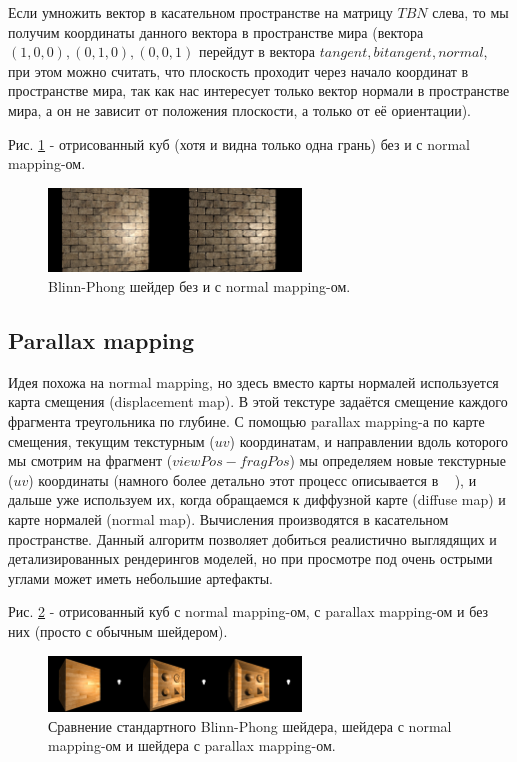 \documentclass[14pt]{extarticle}
\begin{document}
Если умножить вектор в касательном пространстве на матрицу $TBN$ слева, то мы получим координаты данного вектора в пространстве мира (вектора $(1,0,0), (0,1,0), (0,0,1)$ перейдут в вектора $tangent, bitangent, normal$, при этом можно считать, что плоскость проходит через начало координат в пространстве мира, так как нас интересует только вектор нормали в пространстве мира, а он не зависит от положения плоскости, а только от её ориентации).

Рис. \ref{fig:normal} - отрисованный куб (хотя и видна только одна грань) без и с normal mapping-ом.

\begin{figure}
	\label{fig:normal}
	\caption{Blinn-Phong шейдер без и с normal mapping-ом.}
	\includegraphics[width=0.6\textwidth]{normal.png}
\end{figure}

\subsection{Parallax mapping}
Идея похожа на normal mapping, но здесь вместо карты нормалей используется карта смещения (displacement map). В этой текстуре задаётся смещение каждого фрагмента треугольника по глубине. С помощью parallax mapping-а по карте смещения, текущим текстурным ($uv$) координатам, и направлении вдоль которого мы смотрим на фрагмент ($viewPos - fragPos$) мы определяем новые текстурные ($uv$) координаты (намного более детально этот процесс описывается в ~\cite{learnopengl} ), и дальше уже используем их, когда обращаемся к диффузной карте (diffuse map) и карте нормалей (normal map). Вычисления производятся в касательном пространстве. Данный алгоритм позволяет добиться реалистично выглядящих и детализированных рендерингов моделей, но при просмотре под очень острыми углами может иметь небольшие артефакты.

Рис. \ref{fig:parallax} - отрисованный куб с normal mapping-ом, с parallax mapping-ом и без них (просто с обычным шейдером).

\begin{figure}
	\label{fig:parallax}
	\caption{Сравнение стандартного Blinn-Phong шейдера, шейдера с normal mapping-ом и шейдера с parallax mapping-ом.}
	\includegraphics[width=0.6\textwidth]{parallax.png}
\end{figure}
\end{document}
